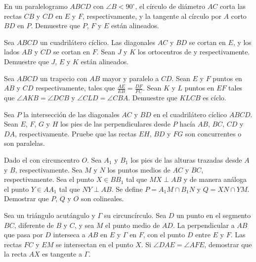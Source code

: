 \begin{section-problem}
    En un paralelogramo $ABCD$ con $\angle B < 90^\circ$, el círculo de diámetro $AC$ corta las rectas $CB$ y $CD$ en $E$ y $F$, respectivamente, y la tangente al círculo por $A$ corto $BD$ en $P$.
    Demuestre que $P$, $F$ y $E$ están alineados.
\end{section-problem}

\begin{section-problem}
    Sea $ABCD$ un cuadrilátero cíclico.
    Las diagonales $AC$ y $BD$ se cortan en $E$, y los lados $AB$ y $CD$ se cortan en $F$.
    Sean $J$ y $K$ los ortocentros de  y  respectivamente.
    Demuestre que $J$, $E$ y $K$ están alineados.
\end{section-problem}

\begin{section-problem}
    Sea $ABCD$ un trapecio con $AB$ mayor y paralelo a $CD$.
    Sean $E$ y $F$ puntos en $AB$ y $CD$ respectivamente, tales que $\frac{AE}{EB} = \frac{DF}{FC}$.
    Sean $K$ y $L$ puntos en $EF$ tales que $\angle AKB = \angle DCB$ y $\angle CLD = \angle CBA$.
    Demuestre que $KLCB$ es cíclo.
\end{section-problem}

\begin{section-problem}
    Sea $P$ la intersección de las diagonales $AC$ y $BD$ en el cuadrilátero cíclico $ABCD$.
    Sean $E$, $F$, $G$ y $H$ los pies de las perpendiculares desde $P$ hacía $AB$, $BC$, $CD$ y $DA$, respectivamente.
    Pruebe que las rectas $EH$, $BD$ y $FG$ son concurrentes o son paralelas.
\end{section-problem}

\begin{section-problem}
    Dado el  con circuncentro $O$.
    Sea $A_1$ y $B_1$ los pies de las alturas trazadas desde $A$ y $B$, respectivamente.
    Sea $M$ y $N$ los puntos medios de $AC$ y $BC$, respectivamente.
    Sea el punto $X \in BB_1$ tal que $MX \perp AB$ y de manera análoga el punto $Y \in AA_1$ tal que $NY \perp AB$.
    Se define $P = A_1 M \cap B_1 N$ y $Q = XN \cap YM$.
    Demostrar que $P$, $Q$ y $O$ son colineales.
\end{section-problem}

\begin{section-problem}
    Sea  un triángulo acutángulo y $\Gamma$ su circuncírculo.
    Sea $D$ un punto en el segmento $BC$, diferente de $B$ y $C$, y sea $M$ el punto medio de $AD$.
    La perpendicular a $AB$ que pasa por $D$ interseca a $AB$ en $E$ y $\Gamma$ en $F$, con el punto $D$ entre $E$ y $F$.
    Las rectas $FC$ y $EM$ se intersectan en el punto $X$.
    Si $\angle DAE = \angle AFE$, demostrar que la recta $AX$ es tangente a $\Gamma$.
\end{section-problem}

